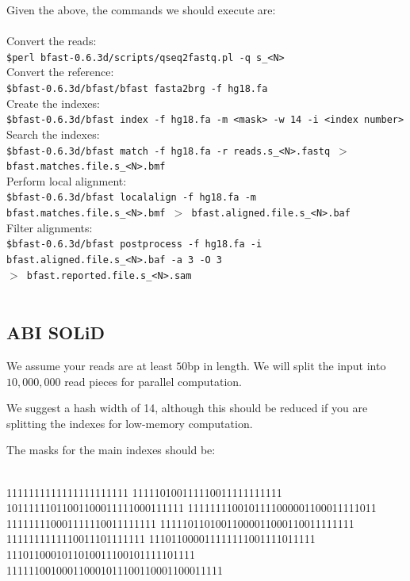 \documentclass[a4paper,12pt]{book}
\newcommand{\Version}{0.6.3d}
\begin{document}
Given the above, the commands we should execute are:
\\\\
Convert the reads:\\
{\tt \scriptsize \$perl bfast-\Version{}/scripts/qseq2fastq.pl -q s\_<N>\\}
Convert the reference:\\
{\tt \scriptsize \$bfast-\Version{}/bfast/bfast fasta2brg -f hg18.fa\\}
Create the indexes:\\
{\tt \scriptsize \$bfast-\Version{}/bfast index -f hg18.fa -m <mask> -w 14 -i <index number>\\}
Search the indexes:\\
{\tt \scriptsize \$bfast-\Version{}/bfast match -f hg18.fa -r reads.s\_<N>.fastq $>$ bfast.matches.file.s\_<N>.bmf\\}
Perform local alignment:\\
{\tt \scriptsize \$bfast-\Version{}/bfast localalign -f hg18.fa -m bfast.matches.file.s\_<N>.bmf $>$ bfast.aligned.file.s\_<N>.baf\\}
Filter alignments:\\
{\tt \scriptsize \$bfast-\Version{}/bfast postprocess -f hg18.fa -i bfast.aligned.file.s\_<N>.baf -a 3 -O 3 \\
$>$ bfast.reported.file.s\_<N>.sam\\}
\\

\subsection{ABI SOLiD}
\label{sec:hg-settings-abi}
We assume your reads are at least $50$bp in length.
We will split the input into $10,000,000$ read pieces for parallel computation.

We suggest a hash width of 14, although this should be reduced if you are splitting the indexes for low-memory computation.

The masks for the main indexes should be:\\
\\
\begin{boxedverbatim}
1111111111111111111111
111110100111110011111111111
10111111011001100011111000111111
1111111100101111000001100011111011
111111110001111110011111111
11111011010011000011000110011111111
1111111111110011101111111
111011000011111111001111011111
1110110001011010011100101111101111
111111001000110001011100110001100011111
\end{boxedverbatim}
\\
\end{document}
